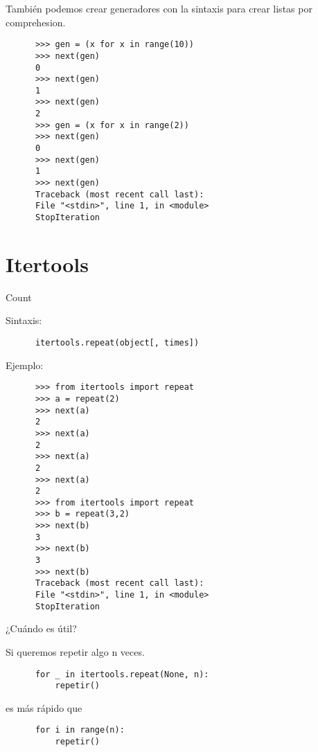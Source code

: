 \documentclass[spanish]{beamer}
\begin{document}
  \begin{frame}[fragile]
    También podemos crear generadores con la sintaxis para crear listas por comprehesion.
    \begin{lstlisting}
      >>> gen = (x for x in range(10))
      >>> next(gen)
      0
      >>> next(gen)
      1
      >>> next(gen)
      2
      >>> gen = (x for x in range(2))
      >>> next(gen)
      0
      >>> next(gen)
      1
      >>> next(gen)
      Traceback (most recent call last):
      File "<stdin>", line 1, in <module>
      StopIteration

    \end{lstlisting}
  \end{frame}

  \section{Itertools}
  \begin{frame}[fragile]{Count}

    Sintaxis:

    \begin{lstlisting}
      itertools.repeat(object[, times])
    \end{lstlisting}

    Ejemplo:

    \begin{lstlisting}
      >>> from itertools import repeat
      >>> a = repeat(2)
      >>> next(a)
      2
      >>> next(a)
      2
      >>> next(a)
      2
      >>> next(a)
      2
      >>> from itertools import repeat
      >>> b = repeat(3,2)
      >>> next(b)
      3
      >>> next(b)
      3
      >>> next(b)
      Traceback (most recent call last):
      File "<stdin>", line 1, in <module>
      StopIteration

    \end{lstlisting}
    
  \end{frame}

  \begin{frame}[fragile]{¿Cuándo es útil?}

    Si queremos repetir algo n veces.

    \begin{lstlisting}
      for _ in itertools.repeat(None, n):
          repetir()
    \end{lstlisting}

    es más rápido que

    \begin{lstlisting}
      for i in range(n):
          repetir()
    \end{lstlisting}
    
  \end{frame}
\end{document}
